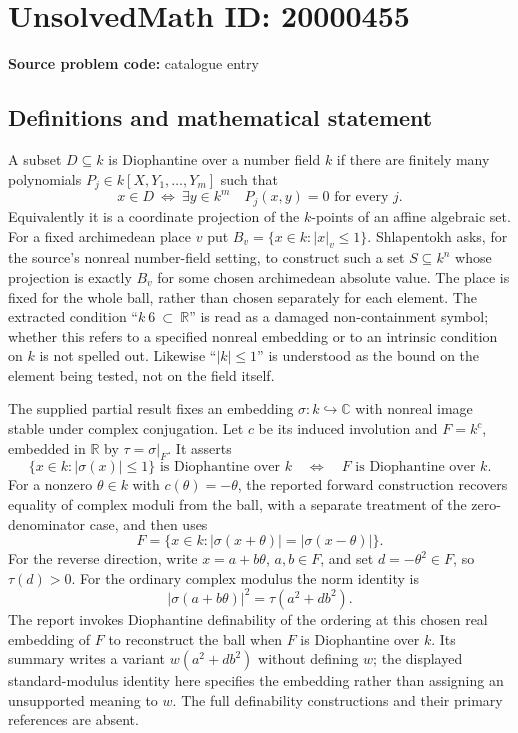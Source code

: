 \documentclass[11pt]{article}
\newcommand{\R}{\mathbb{R}}
\newcommand{\C}{\mathbb{C}}
\begin{document}
\section*{UnsolvedMath ID: 20000455}
\textbf{Source problem code:} catalogue entry
\subsection{Definitions and mathematical statement}
A subset \(D\subseteq k\) is Diophantine over a number field \(k\) if there are finitely many polynomials \(P_j\in k[X,Y_1,\ldots,Y_m]\) such that
\[
 x\in D\ \Longleftrightarrow\ \exists y\in k^m\quad P_j(x,y)=0\text{ for every }j.
\]
Equivalently it is a coordinate projection of the \(k\)-points of an affine algebraic set. For a fixed archimedean place \(v\) put \(B_v=\{x\in k:|x|_v\le1\}\). Shlapentokh asks, for the source's nonreal number-field setting, to construct such a set \(S\subseteq k^n\) whose projection is exactly \(B_v\) for some chosen archimedean absolute value. The place is fixed for the whole ball, rather than chosen separately for each element. The extracted condition ``\(k\ 6\ \subset\ \R\)'' is read as a damaged non-containment symbol; whether this refers to a specified nonreal embedding or to an intrinsic condition on \(k\) is not spelled out. Likewise ``\(|k|\le1\)'' is understood as the bound on the element being tested, not on the field itself.

The supplied partial result fixes an embedding \(\sigma:k\hookrightarrow\C\) with nonreal image stable under complex conjugation. Let \(c\) be its induced involution and \(F=k^c\), embedded in \(\R\) by \(\tau=\sigma|_F\). It asserts
\[
 \{x\in k:|\sigma(x)|\le1\}\text{ is Diophantine over }k
 \quad\Longleftrightarrow\quad F\text{ is Diophantine over }k.
\]
For a nonzero \(\theta\in k\) with \(c(\theta)=-\theta\), the reported forward construction recovers equality of complex moduli from the ball, with a separate treatment of the zero-denominator case, and then uses
\[
 F=\{x\in k:|\sigma(x+\theta)|=|\sigma(x-\theta)|\}.
\]
For the reverse direction, write \(x=a+b\theta\), \(a,b\in F\), and set \(d=-\theta^2\in F\), so \(\tau(d)>0\). For the ordinary complex modulus the norm identity is
\[
 |\sigma(a+b\theta)|^2=\tau(a^2+d b^2).
\]
The report invokes Diophantine definability of the ordering at this chosen real embedding of \(F\) to reconstruct the ball when \(F\) is Diophantine over \(k\). Its summary writes a variant \(w(a^2+d b^2)\) without defining \(w\); the displayed standard-modulus identity here specifies the embedding rather than assigning an unsupported meaning to \(w\). The full definability constructions and their primary references are absent.
\end{document}
